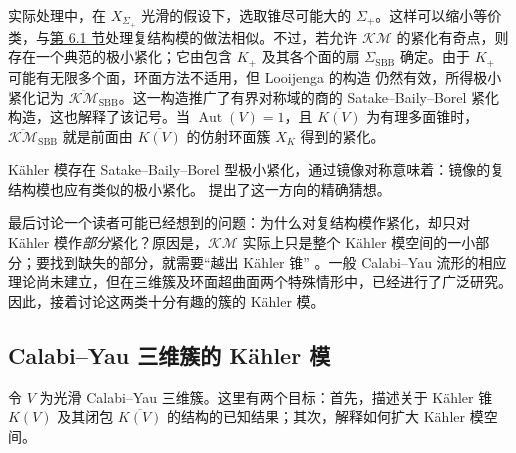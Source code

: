 实际处理中，在 $X_{\Sigma_+}$ 光滑的假设下，选取锥尽可能大的 $\Sigma_+$。这样可以缩小等价类，与\hyperref[sec:complex-moduli]{第 6.1 节}处理复结构模的做法相似。不过，若允许 $\mathcal{KM}$ 的紧化有奇点，则存在一个典范的极小紧化；它由包含 $K_+$ 及其各个面的扇 $\Sigma_{\mathrm{SBB}}$ 确定。由于 $K_+$ 可能有无限多个面，环面方法不适用，但 Looijenga 的构造
仍然有效，所得极小紧化记为 $\overline{\mathcal{KM}}_{\mathrm{SBB}}$。这一构造推广了有界对称域的商的 Satake--Baily--Borel 紧化构造，这也解释了该记号。当 $\operatorname{Aut}(V)=1$，且 $\overline{K(V)}$ 为有理多面锥时，$\overline{\mathcal{KM}}_{\mathrm{SBB}}$ 就是前面由 $\overline{K(V)}$ 的仿射环面簇 $X_K$ 得到的紧化。

Kähler 模存在 Satake--Baily--Borel 型极小紧化，通过镜像对称意味着：镜像的复结构模也应有类似的极小紧化。 提出了这一方向的精确猜想。

最后讨论一个读者可能已经想到的问题：为什么对复结构模作紧化，却只对 Kähler 模作\emph{部分}紧化？原因是，$\mathcal{KM}$ 实际上只是整个 Kähler 模空间的一小部分；要找到缺失的部分，就需要“越出 Kähler 锥” 。一般 Calabi--Yau 流形的相应理论尚未建立，但在三维簇及环面超曲面两个特殊情形中，已经进行了广泛研究。因此，接着讨论这两类十分有趣的簇的 Kähler 模。

\subsection{Calabi--Yau 三维簇的 Kähler 模}\label{subsec:threefold-kahler-moduli}
令 $V$ 为光滑 Calabi--Yau 三维簇。这里有两个目标：首先，描述关于 Kähler 锥 $K(V)$ 及其闭包 $\overline{K(V)}$ 的结构的已知结果；其次，解释如何扩大 Kähler 模空间。

